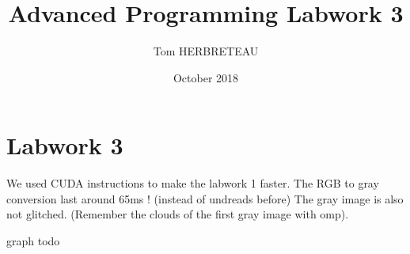 \documentclass{article}
\title{Advanced Programming Labwork 3}
\author{Tom HERBRETEAU }
\date{October 2018}
\begin{document}
\maketitle

\section{Labwork 3}
We used CUDA instructions to make the labwork 1 faster. The RGB to gray conversion last around 65ms ! (instead of undreads before)
The gray image is also not glitched. (Remember the clouds of the first gray image with omp).

graph todo


\end{document}
